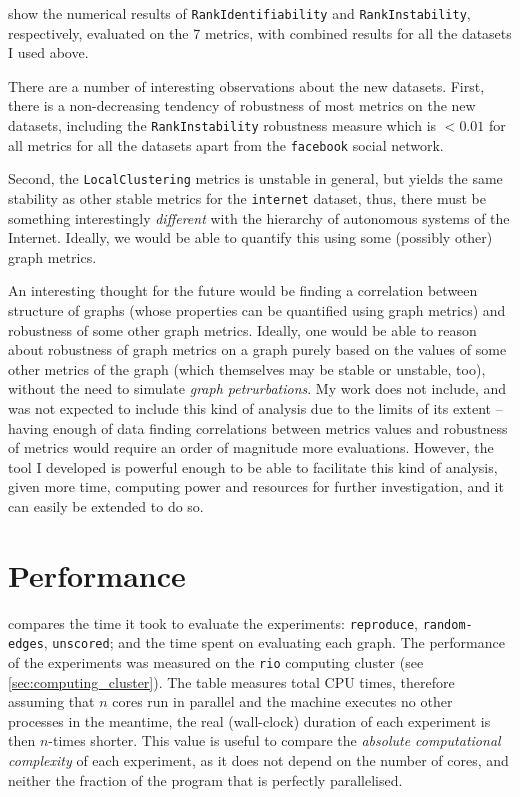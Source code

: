  show the numerical results of \texttt{RankIdentifiability} and \texttt{RankInstability}, respectively, evaluated on the 7 metrics, with combined results for all the datasets I used above.

There are a number of interesting observations about the new datasets.
First, there is a non-decreasing tendency of robustness of most metrics on the new datasets, including the \texttt{RankInstability} robustness measure which is $<0.01$ for all metrics for all the datasets apart from the \texttt{facebook} social network.

Second, the \texttt{LocalClustering} metrics is unstable in general, but yields the same stability as other stable metrics for the \texttt{internet} dataset, thus, there must be something interestingly \textsl{different} with the hierarchy of autonomous systems of the Internet.
Ideally, we would be able to quantify this using some (possibly other) graph metrics.

An interesting thought for the future would be finding a correlation between structure of graphs (whose properties can be quantified using graph metrics) and robustness of some other graph metrics.
Ideally, one would be able to reason about robustness of graph metrics on a graph purely based on the values of some other metrics of the graph (which themselves may be stable or unstable, too), without the need to simulate \textsl{graph petrurbations}.
My work does not include, and was not expected to include this kind of analysis due to the limits of its extent -- having enough of data finding correlations between metrics values and robustness of metrics would require an order of magnitude more evaluations.
However, the \graffs tool I developed is powerful enough to be able to facilitate this kind of analysis, given more time, computing power and resources for further investigation, and it can easily be extended to do so.




\section{Performance}

 compares the time it took to evaluate the experiments: \texttt{reproduce}, \texttt{random-edges}, \texttt{unscored}; and the time spent on evaluating each graph.
The performance of the experiments was measured on the \texttt{rio} computing cluster (see \autoref{sec:computing_cluster}).
The table measures total CPU times, therefore assuming that $n$ cores run in parallel and the machine executes no other processes in the meantime, the real (wall-clock) duration of each experiment is then $n$-times shorter.
This value is useful to compare the \textsl{absolute computational complexity} of each experiment, as it does not depend on the number of cores, and neither the fraction of the program that is perfectly parallelised.

